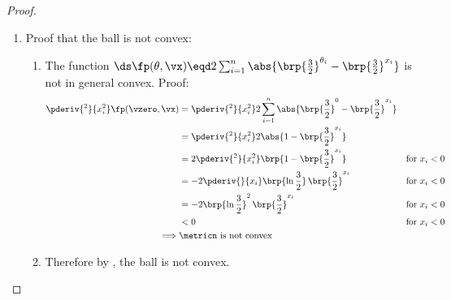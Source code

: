 {\begin{proof}
\begin{enumerate}
  \item Proof that the ball is not convex:
    \begin{enumerate}
      \item The function $\ds\fp(\theta,\vx)\eqd 2\sum_{i=1}^n  \abs{\brp{\frac{3}{2}}^{\theta_i} - \brp{\frac{3}{2}}^{x_i}}$
            is not in general convex. Proof:
        \begin{align*}
          \pderiv{^2}{x_i^2} \fp(\vzero,\vx)
            &= \pderiv{^2}{x_i^2} 2\sum_{i=1}^n  \abs{\brp{\frac{3}{2}}^{0} - \brp{\frac{3}{2}}^{x_i}}
          \\&= \pderiv{^2}{x_i^2} 2 \abs{1 - \brp{\frac{3}{2}}^{x_i}}
          \\&= 2\pderiv{^2}{x_i^2} \brp{1 - \brp{\frac{3}{2}}^{x_i}}
            && \text{for $x_i<0$}
          \\&= -2\pderiv{}{x_i} \brp{\ln\frac{3}{2}}\,\brp{\frac{3}{2}}^{x_i}
            && \text{for $x_i<0$}
          \\&= -2 \brp{\ln\frac{3}{2}}^2\,\brp{\frac{3}{2}}^{x_i}
            && \text{for $x_i<0$}
          \\&< 0
            && \text{for $x_i<0$}
          \\\implies&\text{$\metricn$ is not convex}
        \end{align*}

      \item Therefore by , the ball is not convex.
    \end{enumerate}

\end{enumerate}
\end{proof}


}
